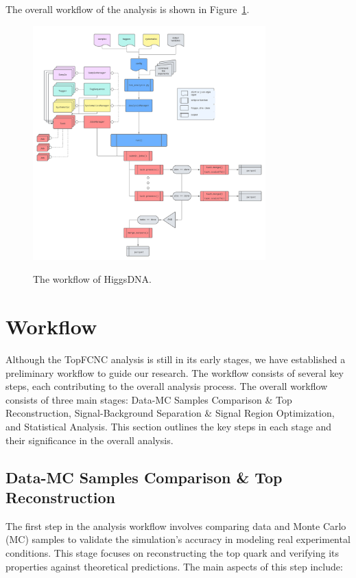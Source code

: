 The overall workflow of the analysis is shown in Figure~\ref{fig:higgs}.

\begin{figure}[htbp]
    \centering
    \includegraphics[width=0.8\textwidth]{Figures/higgs_dna.png}
    \caption{The workflow of HiggsDNA.}
    \label{fig:higgs} \cite{higgs_dna}
\end{figure}


\section{Workflow}

Although the TopFCNC analysis is still in its early stages, we have established a preliminary workflow to guide our research. The workflow consists of several key steps, each contributing to the overall analysis process. The overall workflow consists of three main stages: Data-MC Samples Comparison \& Top Reconstruction, Signal-Background Separation \& Signal Region Optimization, and Statistical Analysis. This section outlines the key steps in each stage and their significance in the overall analysis.

\subsection{Data-MC Samples Comparison \& Top Reconstruction}
The first step in the analysis workflow involves comparing data and Monte Carlo (MC) samples to validate the simulation's accuracy in modeling real experimental conditions. This stage focuses on reconstructing the top quark and verifying its properties against theoretical predictions. The main aspects of this step include:

